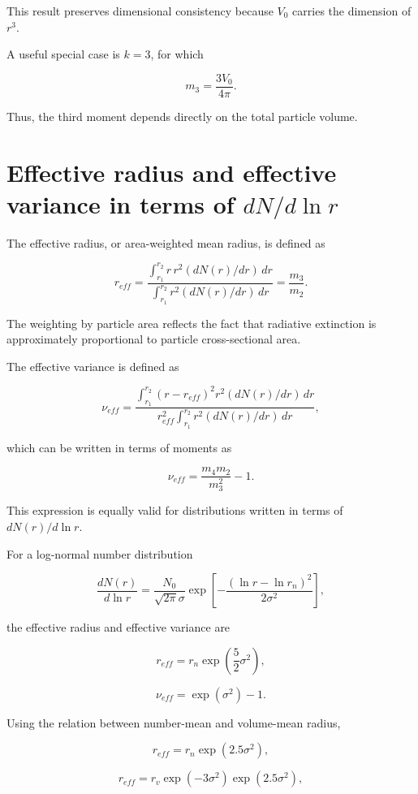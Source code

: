 \documentclass[
  11pt,
  letterpaper,
  DIV=11,
  numbers=noendperiod]{scrreprt}
\begin{document}
This result preserves dimensional consistency because \(V_0\) carries
the dimension of \(r^3\).

A useful special case is \(k=3\), for which

\[
m_3=\frac{3V_0}{4\pi}.
\]

Thus, the third moment depends directly on the total particle volume.

\section{\texorpdfstring{Effective radius and effective variance in
terms of
\(dN/d\ln r\)}{Effective radius and effective variance in terms of dN/d\textbackslash ln r}}\label{effective-radius-and-effective-variance-in-terms-of-dndln-r}

The effective radius, or area-weighted mean radius, is defined as

\[
r_{eff}=\frac{\int_{r_1}^{r_2} r \, r^2 (dN(r)/dr) \, dr}{\int_{r_1}^{r_2} r^2 (dN(r)/dr) \, dr}
=\frac{m_3}{m_2}.
\]

The weighting by particle area reflects the fact that radiative
extinction is approximately proportional to particle cross-sectional
area.

The effective variance is defined as

\[
\nu_{eff}=\frac{\int_{r_1}^{r_2}(r-r_{eff})^2 r^2 (dN(r)/dr) \, dr}
{r^2_{eff} \int_{r_1}^{r_2}r^2 (dN(r)/dr) \, dr},
\]

which can be written in terms of moments as

\[
\nu_{eff}= \frac{m_4 m_2}{m_3^2}-1.
\]

This expression is equally valid for distributions written in terms of
\(dN(r)/d\ln r\).

For a log-normal number distribution

\[
\frac{d N(r)}{d \ln r}=\frac{N_0}{\sqrt{2 \pi} \sigma} \exp\left[-\frac{(\ln r-\ln r_n)^2}{2 \sigma^2}\right],
\]

the effective radius and effective variance are

\[
r_{eff}=r_n \exp\left(\frac{5}{2} \sigma^2\right),
\]

\[
\nu_{eff}=\exp (\sigma^2)-1.
\]

Using the relation between number-mean and volume-mean radius,

\[
r_{eff}=r_n \exp(2.5 \sigma^2),
\]

\[
r_{eff}=r_v \exp(-3 \sigma^2) \exp(2.5 \sigma^2),
\]
\end{document}

